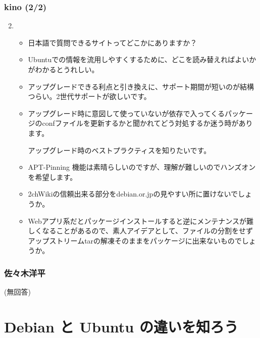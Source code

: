 \documentclass[cjk,dvipdfmx,10pt,compress,%
hyperref={bookmarks=true,bookmarksnumbered=true,bookmarksopen=false,%
colorlinks=false,%
pdftitle={第 72 回 関西 Debian 勉強会},%
pdfauthor={倉敷・のがた・佐々木・かわだ・八津尾},%
pdfsubject={資料},%
}]{beamer}
\begin{document}
\begin{frame}\frametitle{ kino (2/2)}
  \begin{enumerate}
    \setcounter{enumi}{1}
  \item
    \begin{itemize}
    \item 日本語で質問できるサイトってどこかにありますか？
    \item Ubuntuでの情報を流用しやすくするために、どこを読み替えればよいかがわかるとうれしい。
    \item アップグレードできる利点と引き換えに、サポート期間が短いのが結構つらい。2世代サポートが欲しいです。
    \item アップグレード時に意図して使っていないが依存で入ってくるパッケージのconfファイルを更新するかと聞かれてどう対処するか迷う時があります。

      アップグレード時のベストプラクティスを知りたいです。
    \item APT-Pinning 機能は素晴らしいのですが、理解が難しいのでハンズオンを希望します。
    \item 2chWikiの信頼出来る部分をdebian.or.jpの見やすい所に置けないでしょうか。
    \item Webアプリ系だとパッケージインストールすると逆にメンテナンスが難しくなることがあるので、素人アイデアとして、ファイルの分割をせずアップストリームtarの解凍そのままをパッケージに出来ないものでしょうか。
    \end{itemize}
  \end{enumerate}
\end{frame}

\begin{frame}\frametitle{ 佐々木洋平 }

(無回答)

\end{frame}


\section{Debian と Ubuntu の違いを知ろう}

\end{document}
